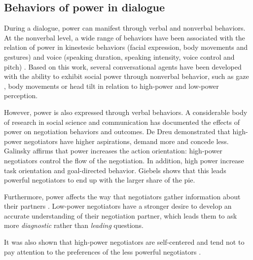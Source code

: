 \documentclass{llncs}
\begin{document}
		\subsection{Behaviors of power in dialogue}
		\label{sec:domDialogue}
		During a dialogue, power can manifest through verbal and nonverbal behaviors.	
		At the nonverbal level, a wide range of behaviors have been associated with the relation of power in kinestesic behaviors (facial expression, body movements and gestures) and voice (speaking duration, speaking intensity, voice control and pitch) \cite{burgoonnonverbal}. Based on this work, several conversational agents have been developed with the ability to exhibit social power through nonverbal behavior, such as gaze \cite{lance2008relation}, body movements \cite{mignault2003many} or head tilt \cite{gebhard2014exploring,callejas2014computational} in relation to high-power and low-power perception.
		
		However, power is also expressed through verbal behaviors. A considerable body of research in social science and communication has documented the effects of power on negotiation behaviors and outcomes. De Dreu \cite{de1995impact} demonstrated that high-power negotiators have higher aspirations, demand more and concede less. Galinsky \cite{galinsky2003power} affirms that power increases the action orientation: high-power negotiators control the flow of the negotiation. In addition, high power increase task orientation and goal-directed behavior. Giebels \cite{giebels2000interdependence} shows that this leads powerful negotiators to end up with the larger share of the pie.
		
		Furthermore, power affects the way that negotiators gather information about their partners \cite{de2004influence}. Low-power negotiators have a stronger desire to develop an accurate understanding of their negotiation partner, which leads them to ask more \emph{diagnostic} rather than \emph{leading} questions.
		
		It was also shown that high-power negotiators are self-centered and tend  not to pay attention to the preferences of the less powerful negotiators \cite{fiske1993controlling,de1995impact}.
		
\end{document}
